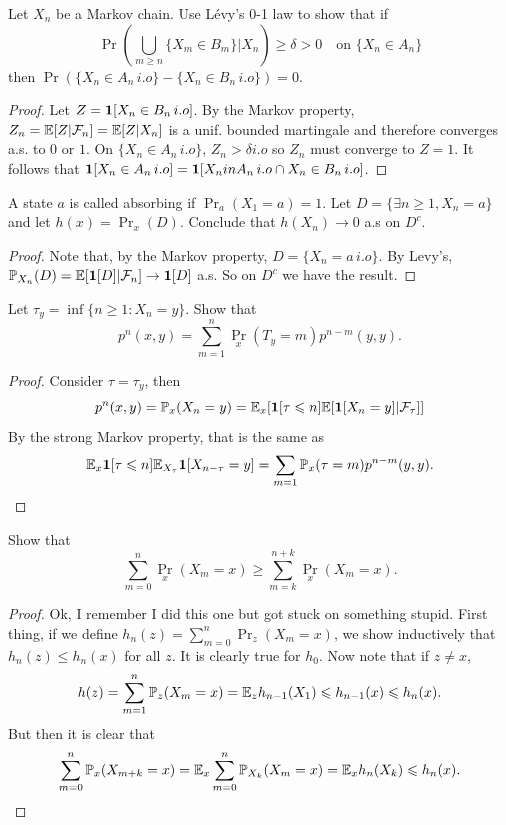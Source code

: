 \begin{exercise}[5.2.2]
	Let $X_n$ be a Markov chain. Use Lévy's 0-1 law to show that if
	\[
		\Pr(\bigcup_{m \geq n} \{X_m \in B_m\}|X_n) \geq \delta > 0 \quad
		\text{on } \{X_n \in A_n\}
	\]
	then $\Pr(\{X_n \in A_n \,i.o\} - \{X_n \in B_n \,i.o\}) = 0$.
\end{exercise}
\begin{proof}
	Let $Z = \bm{1}[X_n \in B_n \,i.o]$. By the Markov property,
	$Z_n = \mathbb{E}[Z | \mathcal{F}_n] = \mathbb{E}[Z | X_n]$ is a unif. bounded martingale
	and therefore converges a.s. to $0$ or $1$. On $\{X_n \in A_n \,i.o\}$,
	$Z_n > \delta i.o$ so $Z_n$ must converge to $Z = 1$. It follows that
	$\bm{1}[X_n \in A_n \,i.o] = \bm{1}[X_n in A_n \,i.o \cap X_n \in B_n \,i.o]$.
\end{proof}

\begin{exercise}[5.2.3]
	A state $a$ is called absorbing if $\Pr_a(X_1 = a) = 1$.
	Let $D = \{\exists n \geq 1, X_n = a\}$ and let $h(x) = \Pr_x(D)$.
	Conclude that $h(X_n) \to 0$ a.s on $D^c$.
\end{exercise}
\begin{proof}
	Note that, by the Markov property, $D = \{X_n = a \,i.o\}$.
	By Levy's, $\mathbb{P}_{X_n}(D) = \mathbb{E}[\bm{1}[D] | \mathcal{F}_n] \rightarrow \bm{1}[D]$ a.s.
	So on $D^c$ we have the result.
\end{proof}

\begin{exercise}[5.2.4]
	Let $\tau_y = \inf\{n \geq 1 : X_n = y\}$. Show that
	\[
		p^n(x,y) = \sum_{m = 1}^{n} \Pr_x(T_y = m)p^{n - m}(y,y).
	\]
\end{exercise}
\begin{proof}
	Consider $\tau = \tau_y$, then
	\[
		p^n(x,y) = \mathbb{P}_x(X_n = y) = \mathbb{E}_x[\bm{1}[\tau \leqslant n]\mathbb{E}[\bm{1}[X_n = y]
		| \mathcal{F}_{\tau}]]
	\]
	By the strong Markov property, that is the same as
	\[
		\mathbb{E}_x\bm{1}[\tau \leqslant n]\mathbb{E}_{X_\tau}\bm{1}[X_{n - \tau} = y] = \sum_{m =
		1} \mathbb{P}_x(\tau = m) p^{n-m}(y,y).
	\]
\end{proof}

\begin{exercise}[5.2.5]
	Show that
	\[\sum_{m = 0}^n \Pr_x(X_m = x) \geq \sum_{m = k}^{n + k}
	\Pr_x(X_m = x).\]
\end{exercise}
\begin{proof}
	Ok, I remember I did this one but got stuck on something stupid.
	First thing, if we define $h_n(z) = \sum_{m = 0}^n \Pr_z(X_m = x)$,
	we show inductively that $h_n(z) \leq h_n(x)$ for all $z$.
	It is clearly true for $h_0$. Now note that if $z \neq x$,
	\[
		h(z) = \sum_{m = 1}^n \mathbb{P}_z(X_m = x) = \mathbb{E}_z h_{n-1}(X_1) \leqslant
		h_{n-1}(x) \leqslant h_{n}(x).
	\]
	But then it is clear that
	\[
		\sum_{m = 0}^{n} \mathbb{P}_x(X_{m+k} = x) =
		\mathbb{E}_x \sum_{m = 0}^n \mathbb{P}_{X_k}(X_m = x)
		= \mathbb{E}_x h_n(X_k) \leqslant h_n(x).
	\]
\end{proof}


